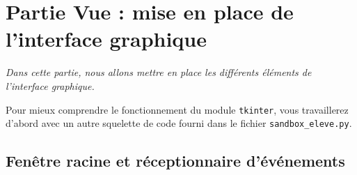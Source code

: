 \documentclass[a4paper, french, 12pt]{article}  %
\begin{document}
\section{Partie Vue : mise en place de l'interface graphique}

{\itshape Dans cette partie, nous allons mettre en place les différents éléments de l'interface graphique. } 


Pour mieux comprendre le fonctionnement du module \texttt{tkinter}, vous travaillerez d'abord avec un autre squelette de code fourni dans le fichier \verb+sandbox_eleve.py+.

\subsection{Fenêtre racine et réceptionnaire d'événements}
\end{document}
